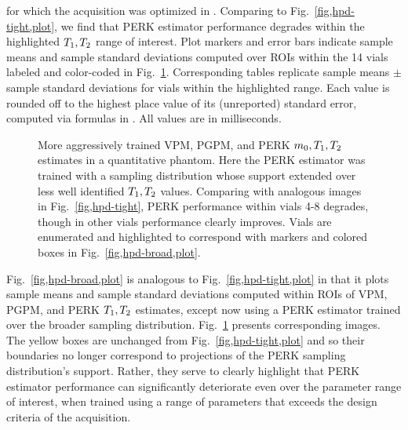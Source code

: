 \begin{figure*}[!t]
{		for which the acquisition was optimized 
		in \cite{nataraj:17:oms}.
		Comparing to Fig.~\ref{fig,hpd-tight,plot},
		we find that PERK estimator performance degrades 
		within the highlighted $T_1,T_2$ range of interest.
		Plot markers and error bars
		indicate sample means and sample standard deviations
		computed over ROIs
		within the 14 vials
		labeled and color-coded
		in Fig.~\ref{fig,hpd-broad}.
		Corresponding tables replicate 
		sample means $\pm$ sample standard deviations
		for vials within the highlighted range.
		Each value is rounded off
		to the highest place value 
		of its (unreported) standard error,
		computed via formulas in \cite{ahn:03:seo}.
		All values are in milliseconds.
	}
	\label{fig,hpd-broad,plot}
\end{figure*}

\begin{figure}[!t]
	\centering
	\begin{minipage}{\textwidth}
  	\hspace{0cm}
  	\hspace{0cm}
	\end{minipage}
	\caption{%
		More aggressively trained 
		VPM, PGPM, and PERK $m_0,T_1,T_2$ estimates
		in a quantitative phantom.
		Here the PERK estimator was trained
		with a sampling distribution
		whose support extended
		over less well identified $T_1,T_2$ values.
		Comparing with analogous images 
		in Fig.~\ref{fig,hpd-tight},
		PERK performance within vials 4-8 degrades,
		though in other vials 
		performance clearly improves. 
		Vials are enumerated and highlighted
		to correspond with markers and colored boxes
		in Fig.~\ref{fig,hpd-broad,plot}.
	}
	\label{fig,hpd-broad}
\end{figure}

Fig.~\ref{fig,hpd-broad,plot} 
is analogous to Fig.~\ref{fig,hpd-tight,plot}
in that it plots sample means and sample standard deviations
computed within ROIs 
of VPM, PGPM, and PERK $T_1,T_2$ estimates,
except now using a PERK estimator trained
over the broader sampling distribution.
Fig.~\ref{fig,hpd-broad} presents corresponding images. 
The yellow boxes are unchanged
from Fig.~\ref{fig,hpd-tight,plot}
and so their boundaries no longer correspond
to projections of the PERK sampling distribution's support.
Rather,
they serve to clearly highlight 
that PERK estimator performance
can significantly deteriorate
even over the parameter range of interest,
when trained using a range of parameters
that exceeds the design criteria
of the acquisition.

